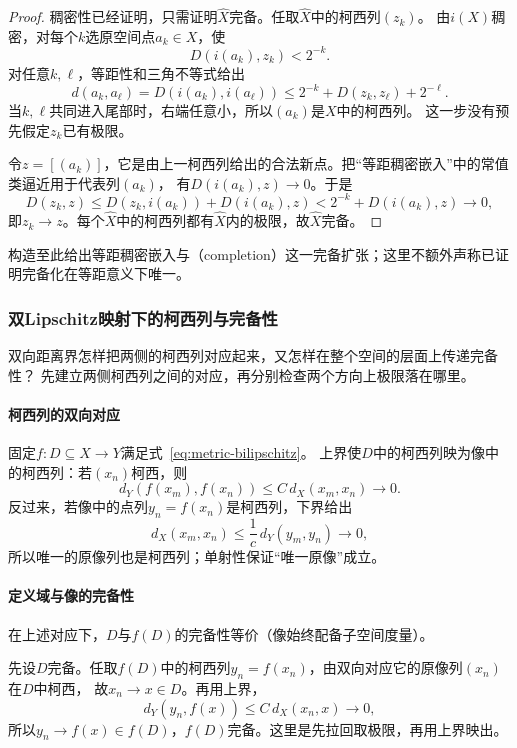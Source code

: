 \begin{proof}
稠密性已经证明，只需证明$\widehat X$完备。任取$\widehat X$中的柯西列$(z_k)$。
由$i(X)$稠密，对每个$k$选原空间点$a_k\in X$，使
\[
  D(i(a_k),z_k)<2^{-k}.
\]
对任意$k,\ell$，等距性和三角不等式给出
\[
  d(a_k,a_\ell)=D(i(a_k),i(a_\ell))
  \leq 2^{-k}+D(z_k,z_\ell)+2^{-\ell}.
\]
当$k,\ell$共同进入尾部时，右端任意小，所以$(a_k)$是$X$中的柯西列。
这一步没有预先假定$z_k$已有极限。

令$z=[(a_k)]$，它是由上一柯西列给出的合法新点。把“等距稠密嵌入”中的常值类逼近用于代表列$(a_k)$，
有$D(i(a_k),z)\to0$。于是
\[
  D(z_k,z)\leq D(z_k,i(a_k))+D(i(a_k),z)<2^{-k}+D(i(a_k),z)\to0,
\]
即$z_k\to z$。每个$\widehat X$中的柯西列都有$\widehat X$内的极限，故$\widehat X$完备。
\end{proof}

构造至此给出等距稠密嵌入与（completion）这一完备扩张；这里不额外声称已证明完备化在等距意义下唯一。

\subsubsection{双Lipschitz映射下的柯西列与完备性}
\label{sec:metric-map-cauchy-preservation}

双向距离界怎样把两侧的柯西列对应起来，又怎样在整个空间的层面上传递完备性？
先建立两侧柯西列之间的对应，再分别检查两个方向上极限落在哪里。

\paragraph{柯西列的双向对应}

固定$f:D\subseteq X\to Y$满足式~\eqref{eq:metric-bilipschitz}。
上界使$D$中的柯西列映为像中的柯西列：若$(x_n)$柯西，则
\[
  d_Y(f(x_m),f(x_n))\leq C\,d_X(x_m,x_n)\to0.
\]
反过来，若像中的点列$y_n=f(x_n)$是柯西列，下界给出
\[
  d_X(x_m,x_n)\leq\frac1c\,d_Y(y_m,y_n)\to0,
\]
所以唯一的原像列也是柯西列；单射性保证“唯一原像”成立。

\paragraph{定义域与像的完备性}

在上述对应下，$D$与$f(D)$的完备性等价（像始终配备子空间度量）。

先设$D$完备。任取$f(D)$中的柯西列$y_n=f(x_n)$，由双向对应它的原像列$(x_n)$在$D$中柯西，
故$x_n\to x\in D$。再用上界，
\[
  d_Y(y_n,f(x))\leq C\,d_X(x_n,x)\to0,
\]
所以$y_n\to f(x)\in f(D)$，$f(D)$完备。这里是先拉回取极限，再用上界映出。


